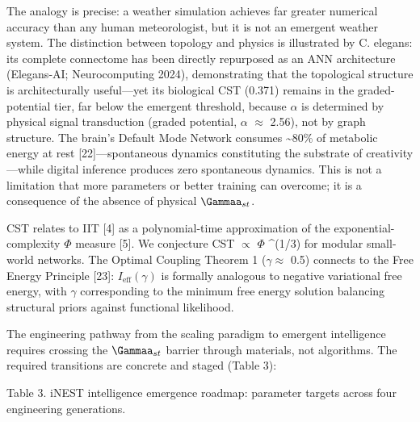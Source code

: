 \documentclass[a4paper,12pt]{article}
\begin{document}
The analogy is precise: a weather simulation achieves far greater numerical accuracy than any human meteorologist, but it is not an emergent weather system.
The distinction between topology and physics is illustrated by C. elegans: its complete connectome has been directly repurposed as an ANN architecture (Elegans-AI; Neurocomputing 2024), demonstrating that the topological structure is architecturally useful---yet its biological CST (0.371) remains in the graded-potential tier, far below the emergent threshold, because  $\alpha$  is determined by physical signal transduction (graded potential,  $\alpha$   $\approx$  2.56), not by graph structure.
The brain's Default Mode Network consumes \textasciitilde{}80\% of metabolic energy at rest [22]---spontaneous dynamics constituting the substrate of creativity---while digital inference produces zero spontaneous dynamics.
This is not a limitation that more parameters or better training can overcome; it is a consequence of the absence of physical $\Gammaa_{st}$.

CST relates to IIT [4] as a polynomial-time approximation of the exponential-complexity  $\Phi$  measure [5]. We conjecture CST $\propto$  $\Phi$ ^(1/3) for modular small-world networks. The Optimal Coupling Theorem 1 ($\gamma \approx$ 0.5) connects to the Free Energy Principle [23]: $I_{\text{eff}}(\gamma)$ is formally analogous to negative variational free energy, with  $\gamma$  corresponding to the minimum free energy solution balancing structural priors against functional likelihood.

The engineering pathway from the scaling paradigm to emergent intelligence requires crossing the $\Gammaa_{st}$ barrier through materials, not algorithms. The required transitions are concrete and staged (Table 3):

Table 3. iNEST intelligence emergence roadmap: parameter targets across four engineering generations.
\end{document}
